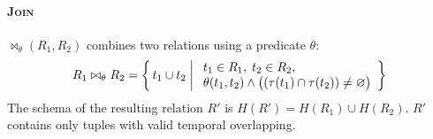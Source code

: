\paragraph{\textbf{\textsc{Join}}} $\bowtie_{\theta}(R_1, R_2)$ combines two relations using a predicate $\theta$:
\[
R_1 \bowtie_{\theta} R_2 =
\left\{
\, t_1 \cup t_2\;\middle|\;
\begin{array}{l}
t_1 \in R_1,\;t_2 \in R_2,\\
\theta(t_1,t_2)\land \big((\tau(t_1) \cap \tau(t_2)) \ne \varnothing\big)
\end{array}
\right\}
\]
The schema of the resulting relation $R'$ is $H(R') = H(R_1) \cup H(R_2)$.
$R'$ contains only tuples with valid temporal overlapping.


